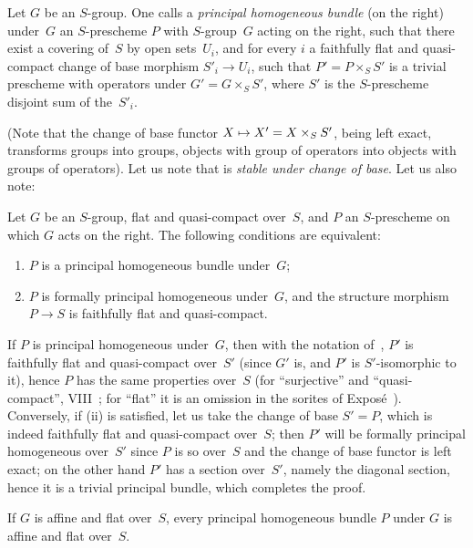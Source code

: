\begin{definition}
\label{XI.4.1}
Let $G$ be an $S$-group. One calls a \emph{principal
homogeneous bundle} (on the right) under~$G$ an $S$-prescheme $P$
with $S$-group~$G$ acting on the right, such that there exist a covering of~$S$ by open sets~$U_i$, and for every $i$ a faithfully flat
and quasi-compact change of base morphism $S'_i\to U_i$, such that
$P'=P\times_S S'$ is a trivial prescheme with operators
under $G'=G\times_S S'$, where $S'$ is the
$S$-prescheme disjoint sum of the~$S'_i$.
\end{definition}

(Note
that the change of base functor $X\mto X'=X\times_S
S'$,
being left exact, transforms groups into groups, objects
with group of operators into objects with groups
of operators). Let us note that  is \emph{stable under
change of base}. Let us also note:

\begin{proposition}
\label{XI.4.2}
Let $G$ be an $S$-group, flat and quasi-compact over~$S$, and $P$ an
$S$-prescheme on which $G$ acts on the right. The following conditions
are equivalent:
\begin{enumerate}
\item[(i)] $P$ is a principal homogeneous bundle
under~$G$;
\item[(ii)] $P$ is formally principal homogeneous under~$G$,
and the structure morphism $P\to S$ is faithfully flat and
quasi-compact.
\end{enumerate}
\end{proposition}

If $P$ is principal homogeneous under~$G$, then with the notation
of~, $P'$ is faithfully flat and quasi-compact over~$S'$
(since $G'$ is, and $P'$ is $S'$-isomorphic to it), hence $P$ has the
same properties over~$S$ (for ``surjective'' and
``quasi-compact'', \cf VIII~; for ``flat'' it is an
omission in the sorites of Expos\'e~). Conversely, if
(ii) is satisfied, let us take the change of base $S'=P$, which
is indeed faithfully flat and quasi-compact over~$S$; then $P'$ will be
formally principal homogeneous over~$S'$ since $P$ is so over~$S$
and the change of base functor is left exact; on the other
hand $P'$ has a section over~$S'$,
namely the diagonal section, hence
it is a trivial principal bundle, which completes the
proof.

\begin{corollary}
\label{XI.4.3}
If $G$ is affine and flat over~$S$, every principal
homogeneous bundle $P$ under $G$ is affine and flat over~$S$.
\end{corollary}

